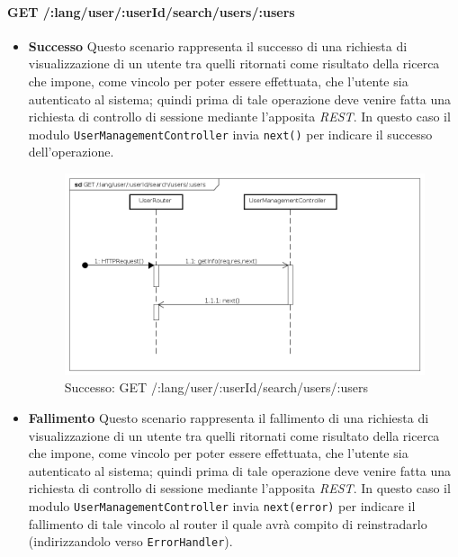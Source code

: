 \paragraph{GET /:lang/user/:userId/search/users/:users}
\begin{itemize}
\item \textbf{Successo}
Questo scenario rappresenta il successo di una richiesta di visualizzazione di un utente tra quelli ritornati come risultato della ricerca che impone, come vincolo per poter essere effettuata, che l'utente sia autenticato al sistema; quindi prima di tale operazione deve venire fatta una richiesta di controllo di sessione mediante l'apposita \textit{REST}. In questo caso il modulo \texttt{UserManagementController} invia \texttt{next()} per indicare il successo dell'operazione.

\begin{figure}[ht]
	\centering
	\includegraphics[scale=0.45]{UML/DiagrammiDiSequenza/Back-end/GET__lang_user__userId_search_users__users_success.png}
	\caption{Successo: GET /:lang/user/:userId/search/users/:users}
\end{figure}
\FloatBarrier

\item \textbf{Fallimento}
Questo scenario rappresenta il fallimento di una richiesta di visualizzazione di un utente tra quelli ritornati come risultato della ricerca che impone, come vincolo per poter essere effettuata, che l'utente sia autenticato al sistema; quindi prima di tale operazione deve venire fatta una richiesta di controllo di sessione mediante l'apposita \textit{REST}. In questo caso il modulo \texttt{UserManagementController} invia \texttt{next(error)} per indicare il fallimento di tale vincolo al router il quale avrà compito di reinstradarlo (indirizzandolo verso \texttt{ErrorHandler}).


\end{itemize}
